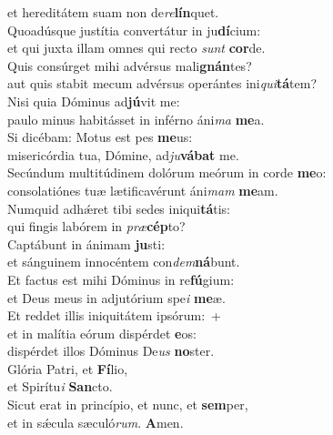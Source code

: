 \evenverse et hereditátem suam non de\textit{re}\textbf{lín}quet.\\
\oddverse Quoadúsque justítia convertátur in ju\textbf{dí}cium:~\*\\
\oddverse et qui juxta illam omnes qui recto \textit{sunt} \textbf{cor}de.\\
\evenverse Quis consúrget mihi advérsus mali\textbf{gnán}tes?~\*\\
\evenverse aut quis stabit mecum advérsus operántes ini\textit{qui}\textbf{tá}tem?\\
\oddverse Nisi quia Dóminus ad\textbf{jú}vit me:~\*\\
\oddverse paulo minus habitásset in inférno áni\textit{ma} \textbf{me}a.\\
\evenverse Si dicébam: Motus est pes \textbf{me}us:~\*\\
\evenverse misericórdia tua, Dómine, ad\textit{ju}\textbf{vá}\textbf{bat} me.\\
\oddverse Secúndum multitúdinem dolórum meórum in corde \textbf{me}o:~\*\\
\oddverse consolatiónes tuæ lætificavérunt áni\textit{mam} \textbf{me}am.\\
\evenverse Numquid adhǽret tibi sedes iniqui\textbf{tá}tis:~\*\\
\evenverse qui fingis labórem in \textit{præ}\textbf{cép}to?\\
\oddverse Captábunt in ánimam \textbf{ju}sti:~\*\\
\oddverse et sánguinem innocéntem con\textit{dem}\textbf{ná}bunt.\\
\evenverse Et factus est mihi Dóminus in re\textbf{fú}gium:~\*\\
\evenverse et Deus meus in adjutórium spe\textit{i} \textbf{me}æ.\\
\oddverse Et reddet illis iniquitátem ipsórum:~+\\
\oddverse  et in malítia eórum dispérdet \textbf{e}os:~\*\\
\oddverse dispérdet illos Dóminus De\textit{us} \textbf{no}ster.\\
\evenverse Glória Patri, et \textbf{Fí}lio,~\*\\
\evenverse et Spirítu\textit{i} \textbf{San}cto.\\
\oddverse Sicut erat in princípio, et nunc, et \textbf{sem}per,~\*\\
\oddverse et in sǽcula sæculó\textit{rum}. \textbf{A}men.\\
